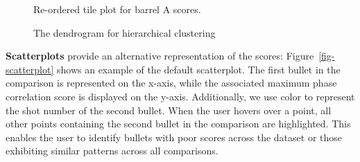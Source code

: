 \documentclass[
  number,
  preprint,
  5p,
  twocolumn]{elsarticle}
\begin{document}
\begin{figure}


\caption{\label{fig-ClusteredMatrix}Re-ordered tile plot for barrel A
scores.}

\end{figure}%

\begin{figure}


\caption{\label{fig-dendrogram}The dendrogram for hierarchical
clustering}

\end{figure}%

\hfill\newline

\textbf{Scatterplots} provide an alternative representation of the
scores: Figure~\ref{fig-scatterplot} shows an example of the default
scatterplot. The first bullet in the comparison is represented on the
x-axis, while the associated maximum phase correlation score is
displayed on the y-axis. Additionally, we use color to represent the
shot number of the second bullet. When the user hovers over a point, all
other points containing the second bullet in the comparison are
highlighted. This enables the user to identify bullets with poor scores
across the dataset or those exhibiting similar patterns across all
comparisons.
\end{document}
